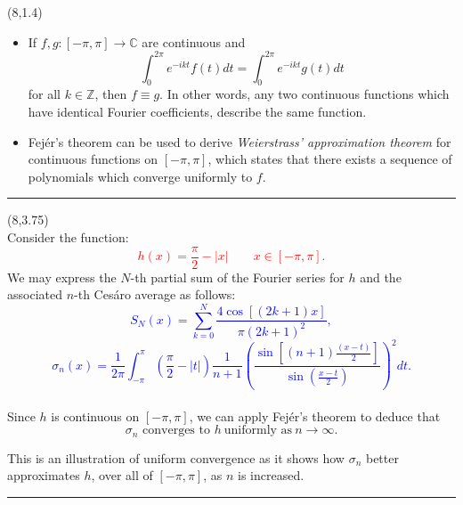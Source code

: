 \documentclass[a1,portrait]{a0poster}
\def\LHead#1{\noindent{\LARGE\color{DarkBlue}\sf #1}\bigskip}
\begin{document}
    \begin{textblock}{7}(8,1.4)
    \sf
    
    \begin{itemize}
    \item If $f,g:[-\pi,\pi] \to \mathbb{C}$ are continuous and $$\int_0^{2\pi}e^{-ikt}f(t)dt=\int_0^{2\pi}e^{-ikt}g(t)dt$$ for all $k \in \mathbb{Z}$, then $f\equiv g$. In other words, any two continuous functions which have identical Fourier coefficients, describe the same function. 
    \item Fej\'er's theorem can be used to derive \emph{Weierstrass' approximation theorem} for continuous functions on $[-\pi,\pi]$, which states that there exists a sequence of polynomials which converge uniformly to $f$.
    \end{itemize}
    \bigskip
    \hrule
    \end{textblock}
 
    \begin{textblock}{7}(8,3.75)
    \LHead{\textbf{Example}}\\
    \sf
    Consider the function: \textcolor{red}{$$ h(x) = \frac{\pi}{2} -  |x| \quad \quad x\in [-\pi, \pi].$$}We may express the $N$-th partial sum of the Fourier series for $h$ and the associated $n$-th Ces\'aro average as follows:
    \textcolor{blue}{$$ S_N(x) = \sum_{k=0}^{N} \frac{4\cos[(2k+1)x]}{\pi(2k+1)^2}, $$}
    \textcolor{blue}{$$ \sigma_n(x) = \frac{1}{2\pi}\int_{-\pi}^{\pi} \left(\frac{\pi}{2} - |t| \right)\frac{1}{n+1}\left(\frac{\sin[(n+1)\frac{(x-t)}{2}]}{\sin(\frac{x-t}{2})}\right)^2 dt. $$}
    \\
Since $h$ is continuous on $[-\pi, \pi]$, we can apply Fej\'er's theorem to deduce that
    $$ \sigma_n \text{ converges to } h \ \text{uniformly as} \  n \to \infty.$$
    \vspace{-2.6em}
    \begin{center}
    \end{center}
    \vspace{-1.6em}
    This is an illustration of uniform convergence as it shows how $\sigma_n$ better approximates $h$, over all of $[-\pi,\pi]$, as $n$ is increased.    \vspace{0mm}
    \hrule
    \end{textblock}
\end{document}
